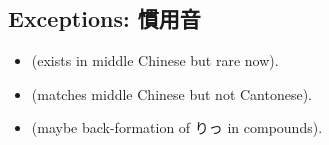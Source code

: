 \documentclass{article}
\begin{document}
\subsection{Exceptions: 慣用音}

\begin{itemize}
    \item {} (exists in middle Chinese but rare now).
    \item {} (matches middle Chinese but not Cantonese).
    \item {} (maybe back-formation of りっ in compounds).
\end{itemize}

% 
% 
\end{document}
